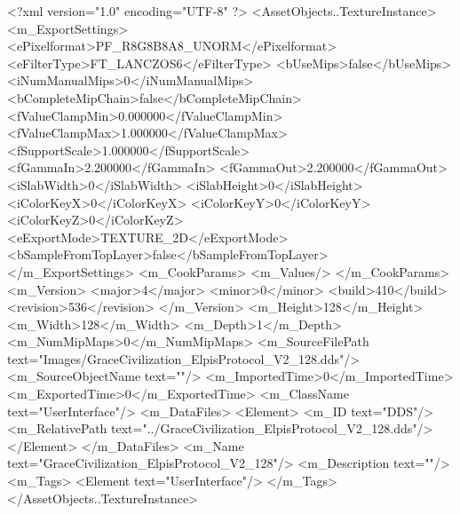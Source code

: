 <?xml version="1.0" encoding="UTF-8" ?>
<AssetObjects..TextureInstance>
	<m_ExportSettings>
		<ePixelformat>PF_R8G8B8A8_UNORM</ePixelformat>
		<eFilterType>FT_LANCZOS6</eFilterType>
		<bUseMips>false</bUseMips>
		<iNumManualMips>0</iNumManualMips>
		<bCompleteMipChain>false</bCompleteMipChain>
		<fValueClampMin>0.000000</fValueClampMin>
		<fValueClampMax>1.000000</fValueClampMax>
		<fSupportScale>1.000000</fSupportScale>
		<fGammaIn>2.200000</fGammaIn>
		<fGammaOut>2.200000</fGammaOut>
		<iSlabWidth>0</iSlabWidth>
		<iSlabHeight>0</iSlabHeight>
		<iColorKeyX>0</iColorKeyX>
		<iColorKeyY>0</iColorKeyY>
		<iColorKeyZ>0</iColorKeyZ>
		<eExportMode>TEXTURE_2D</eExportMode>
		<bSampleFromTopLayer>false</bSampleFromTopLayer>
	</m_ExportSettings>
	<m_CookParams>
		<m_Values/>
	</m_CookParams>
	<m_Version>
		<major>4</major>
		<minor>0</minor>
		<build>410</build>
		<revision>536</revision>
	</m_Version>
	<m_Height>128</m_Height>
	<m_Width>128</m_Width>
	<m_Depth>1</m_Depth>
	<m_NumMipMaps>0</m_NumMipMaps>
	<m_SourceFilePath text="Images/GraceCivilization_ElpisProtocol_V2_128.dds"/>
	<m_SourceObjectName text=""/>
	<m_ImportedTime>0</m_ImportedTime>
	<m_ExportedTime>0</m_ExportedTime>
	<m_ClassName text="UserInterface"/>
	<m_DataFiles>
		<Element>
			<m_ID text="DDS"/>
			<m_RelativePath text="../GraceCivilization_ElpisProtocol_V2_128.dds"/>
		</Element>
	</m_DataFiles>
	<m_Name text="GraceCivilization_ElpisProtocol_V2_128"/>
	<m_Description text=""/>
	<m_Tags>
		<Element text="UserInterface"/>
	</m_Tags>
</AssetObjects..TextureInstance>
